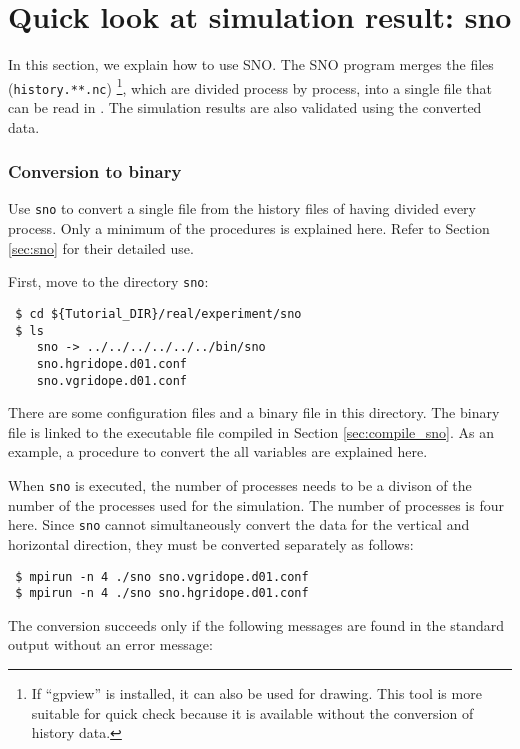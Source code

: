 \section{Quick look at simulation result: sno} \label{sec:quicklook}

In this section, we explain how to use SNO.
The SNO program merges the \netcdf files (\verb|history.**.nc|)
\footnote{If ``gpview'' is installed, it can also be used for drawing.
This tool is more suitable for quick check  because it is available without the conversion of history data.},
which are divided process by process, into a single \netcdf file that can be read in \grads.
The simulation results are also validated using the converted \netcdf data.

\subsubsection{Conversion to \grads binary}
Use \verb|sno| to convert a single \netcdf file from the history files of \netcdf having divided every process.
Only a minimum of the procedures is explained here. Refer to Section \ref{sec:sno} for their detailed use.

First, move to the directory \verb|sno|:
\begin{verbatim}
 $ cd ${Tutorial_DIR}/real/experiment/sno
 $ ls
    sno -> ../../../../../../bin/sno
    sno.hgridope.d01.conf
    sno.vgridope.d01.conf
\end{verbatim}
There are some configuration files and a binary file in this directory.
The binary file is linked to the executable file compiled in Section \ref{sec:compile_sno}.
As an example, a procedure to convert the all variables are explained here.
 
When \verb|sno| is executed, the number of processes needs to be a divison of the number of the processes used for the simulation. 
The number of processes is four here.
Since \verb|sno| cannot simultaneously convert the data for the vertical and horizontal direction,
they must be converted separately as follows:
\begin{verbatim}
 $ mpirun -n 4 ./sno sno.vgridope.d01.conf
 $ mpirun -n 4 ./sno sno.hgridope.d01.conf
\end{verbatim}
The conversion succeeds only if the following messages are found in the standard output without an error message:

